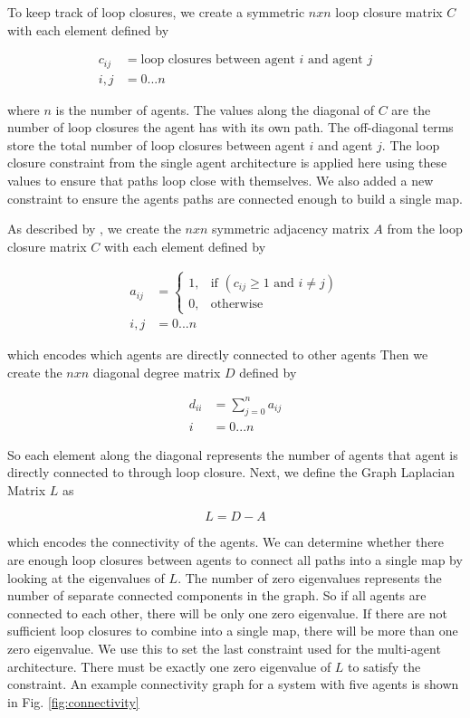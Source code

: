 \documentclass[letterpaper, 10 pt, conference]{ieeeconf}  %
\begin{document}
To keep track of loop closures, we create a symmetric $nxn$ loop closure matrix $C$ with each element defined by

\begin{align}
  c_{ij} &= \text{loop closures between agent } i \text{ and agent } j \\
  i,j &= 0...n \nonumber
\end{align}

where $n$ is the number of agents. The values along the diagonal of $C$ are the number of loop closures the agent has with its own path. The off-diagonal terms store the total number of loop closures between agent $i$ and agent $j$. The loop closure constraint from the single agent architecture is applied here using these values to ensure that paths loop close with themselves. We also added a new constraint to ensure the agents paths are connected enough to build a single map.

As described by \cite{Weisstein}, we create the $nxn$ symmetric adjacency matrix $A$ from the loop closure matrix $C$ with each element defined by

\begin{align}
  a_{ij} &=
  \begin{cases}
    1, & \text{if } (c_{ij} \geq 1 \text{ and } i \neq j)\\
    0, & \text{otherwise}
  \end{cases}\\
  i,j &=0 ...n \nonumber
\end{align}

which encodes which agents are directly connected to other agents
Then we create the $nxn$ diagonal degree matrix $D$ defined by

\begin{align}
  d_{ii} &= \sum_{j=0}^{n} a_{ij} \\
  i &= 0 ... n \nonumber
\end{align}

So each element along the diagonal represents the number of agents that agent is directly connected to through loop closure. Next, we define the Graph Laplacian Matrix $L$ as

\begin{equation}
  L = D-A
\end{equation}

which encodes the connectivity of the agents. We can determine whether there are enough loop closures between agents to connect all paths into a single map by looking at the eigenvalues of $L$. The number of zero eigenvalues represents the number of separate connected components in the graph. So if all agents are connected to each other, there will be only one zero eigenvalue. If there are not sufficient loop closures to combine into a single map, there will be more than one zero eigenvalue. We use this to set the last constraint used for the multi-agent architecture. There must be exactly one zero eigenvalue of $L$ to satisfy the constraint. An example connectivity graph for a system with five agents is shown in Fig. \ref{fig:connectivity}
\end{document}

